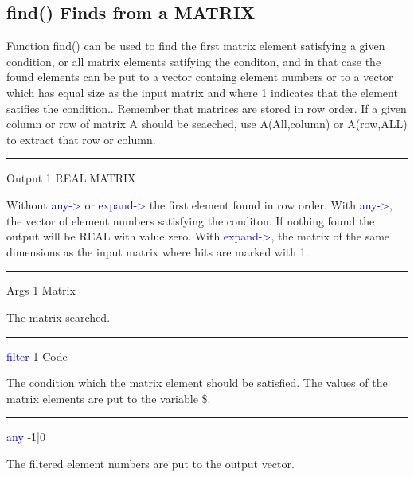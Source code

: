\subsection{\textcolor{VioletRed}{find}() Finds from a MATRIX}
\label{find}
Function \textcolor{VioletRed}{find}() can be used to find the first matrix element satisfying a given condition, or
all matrix elements satifying the conditon, and in that case the found
elements can be put to a vector containg element numbers or to a
vector which has equal size as the input matrix and where 1 indicates that
the element satifies the condition..
Remember that matrices are stored in row order. If a given column or row of matrix A should be seaeched,
use A(All,column) or A(row,ALL) to extract that row or column.
\vspace{0.3cm}
\hrule
\vspace{0.3cm}
\noindent Output \tabto{3cm}  1 \tabto{5cm}   REAL|MATRIX \tabto{7cm}
\begin{changemargin}{3cm}{0cm}
\noindent Without \textcolor{blue}{any->} or \textcolor{blue}{expand->} the first element found in row order.
With \textcolor{blue}{any->}, the vector of element numbers satisfying the conditon. If nothing found
the output will be REAL with value zero.
With \textcolor{blue}{expand->}, the matrix of the same dimensions as the input matrix where
hits are marked with 1.
\end{changemargin}
\vspace{0.3cm}
\hrule
\vspace{0.3cm}
\noindent Args \tabto{3cm} 1 \tabto{5cm}  Matrix \tabto{7cm}
\begin{changemargin}{3cm}{0cm}
\noindent  The matrix searched.
\end{changemargin}
\vspace{0.3cm}
\hrule
\vspace{0.3cm}
\noindent \textcolor{blue}{filter} \tabto{3cm} 1 \tabto{5cm}  Code \tabto{7cm}
\begin{changemargin}{3cm}{0cm}
\noindent The condition which the matrix element should be satisfied. The
values of the matrix elements are put to the variable \$.
\end{changemargin}
\vspace{0.3cm}
\hrule
\vspace{0.3cm}
\noindent \textcolor{blue}{any} \tabto{3cm} -1|0 \tabto{5cm}    \tabto{7cm}
\begin{changemargin}{3cm}{0cm}
\noindent  The filtered element numbers are put to the output vector.
\end{changemargin}
